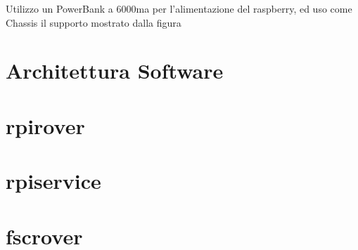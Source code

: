 Utilizzo un PowerBank a 6000ma per l’alimentazione del raspberry, ed uso come Chassis il supporto mostrato dalla figura

\section{Architettura Software}

\section{rpirover}
 
\section{rpiservice}

\section{fscrover}

